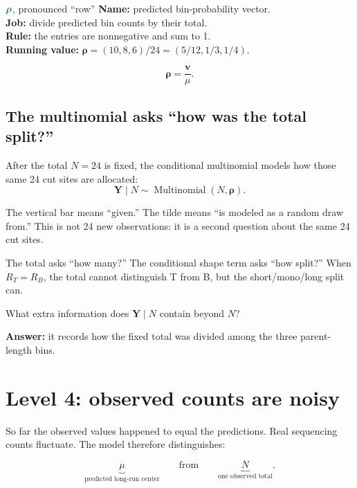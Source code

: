 \documentclass[11pt]{article}
\newcommand{\Mult}{\operatorname{Multinomial}}
\newcommand{\calcq}[1]{\textcolor{calcteal!85!black}{#1}}
\begin{document}
\begin{newvar}{\(\calcq{\boldsymbol{\rho}}\), pronounced “row”}
\textbf{Name:} predicted bin-probability vector.\\
\textbf{Job:} divide predicted bin counts by their total.\\
\textbf{Rule:} the entries are nonnegative and sum to 1.\\
\textbf{Running value:}
\(\boldsymbol{\rho}=(10,8,6)/24=(5/12,1/3,1/4)\).
\end{newvar}

\[
\boxed{\boldsymbol{\rho}=\frac{\boldsymbol v}{\mu}.}
\]

\subsection{The multinomial asks “how was the total split?”}

After the total \(N=24\) is fixed, the conditional multinomial models how those
same 24 cut sites are allocated:
\[
\boxed{
\boldsymbol{Y}\mid N
\sim
\Mult(N,\boldsymbol{\rho}).
}
\]

The vertical bar means “given.” The tilde means “is modeled as a random draw
from.” This is not 24 new observations: it is a second question about the same
24 cut sites.

\begin{bigidea}
The total asks “how many?” The conditional shape term asks “how split?” When
\(R_T=R_B\), the total cannot distinguish T from B, but the short/mono/long split
can.
\end{bigidea}

\begin{checkpoint}
What extra information does \(\boldsymbol Y\mid N\) contain beyond \(N\)?

\textbf{Answer:} it records how the fixed total was divided among the three
parent-length bins.
\end{checkpoint}

\section{Level 4: observed counts are noisy}

So far the observed values happened to equal the predictions. Real sequencing
counts fluctuate. The model therefore distinguishes:

\[
\underbrace{\mu}_{\text{predicted long-run center}}
\qquad\text{from}\qquad
\underbrace{N}_{\text{one observed total}}.
\]
\end{document}

